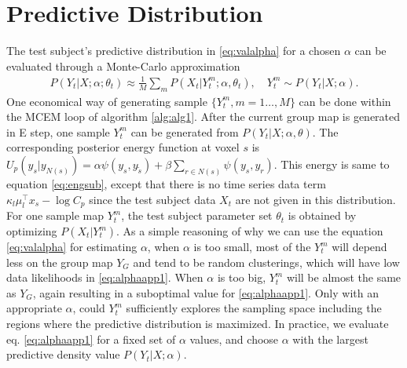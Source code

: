 \documentclass[review,authoryear]{elsarticle}
\begin{document}
\section{Predictive Distribution}
\label{sec:appalpha}
The test subject's predictive distribution in \eqref{eq:valalpha} for a chosen
$\alpha$ can be evaluated through a Monte-Carlo approximation
\begin{align}
P(Y_t|X; \alpha; \theta_t) \approx \frac{1}{M}\sum_m P(X_t|Y_t^m; \alpha, \theta_t), \quad Y_t^m \sim P(Y_t|X; \alpha). \label{eq:alphaapp1}
\end{align}
One economical way of generating sample $\{Y_t^m, m = 1\dots, M\}$ can be done
within the MCEM loop of algorithm \ref{alg:alg1}. After the current group map is
generated in E step, one sample $Y_t^m$ can be generated from $P(Y_t|X; \alpha,
\theta)$. The corresponding posterior energy function at voxel $s$ is $U_p
(y_s|y_{ N(s)}) = \alpha \psi(y_s,y_{\tilde s}) + \beta\sum_{r\in N(s)} \psi
(y_s, y_r)$. This energy is same to equation \eqref{eq:engsub}, except that
there is no time series data term $\kappa_l \mu_l^{\intercal} x_s - \log C_p$
since the test subject data $X_t$ are not given in this distribution.  For one
sample map $Y_t^m$, the test subject parameter set $\theta_t$ is obtained by
optimizing $P(X_t | Y_t^m)$. As a simple reasoning of why we can use the equation
\eqref{eq:valalpha} for estimating $\alpha$, when $\alpha$ is too small, most of
the $Y_t^m$ will depend less on the group map $Y_G$ and tend to be random
clusterings, which will have low data likelihoods in \eqref{eq:alphaapp1}. When
$\alpha$ is too big, $Y_t^m$ will be almost the same as $Y_G$, again resulting
in a suboptimal value for \eqref{eq:alphaapp1}. Only with an appropriate
$\alpha$, could $Y_t^m$ sufficiently explores the sampling space including the
regions where the predictive distribution is maximized. In practice, we evaluate
eq. \eqref{eq:alphaapp1} for a fixed set of $\alpha$ values, and choose $\alpha$
with the largest predictive density value $P(Y_t|X; \alpha)$.



\end{document}
